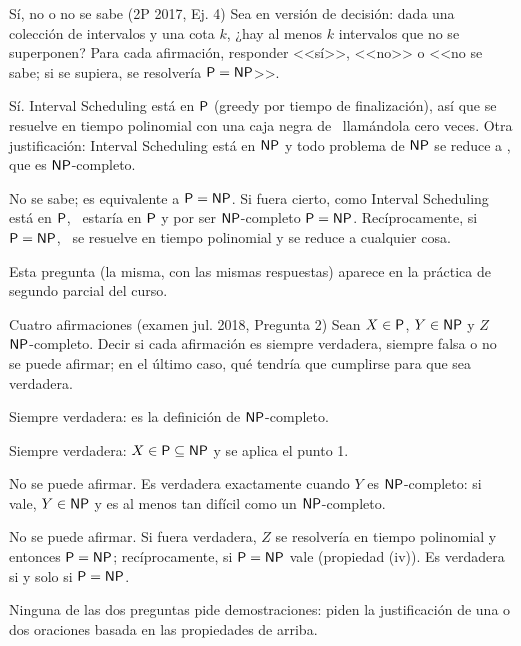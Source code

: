 \begin{problema}{Sí, no o no se sabe (2P 2017, Ej. 4)}
Sea  en versión de decisión: dada una colección de intervalos y una cota $k$, ¿hay al menos $k$ intervalos que no se superponen? Para cada afirmación, responder <<sí>>, <<no>> o <<no se sabe; si se supiera, se resolvería $\mathsf{P}=\mathsf{NP}$>>.

 Sí. Interval Scheduling está en $\mathsf{P}$ (greedy por tiempo de finalización), así que se resuelve en tiempo polinomial con una caja negra de \npVC\ llamándola cero veces. Otra justificación: Interval Scheduling está en $\mathsf{NP}$ y todo problema de $\mathsf{NP}$ se reduce a \npVC, que es $\mathsf{NP}$-completo.

 No se sabe; es equivalente a $\mathsf{P}=\mathsf{NP}$. Si fuera cierto, como Interval Scheduling está en $\mathsf{P}$, \npIS\ estaría en $\mathsf{P}$ y por ser $\mathsf{NP}$-completo $\mathsf{P}=\mathsf{NP}$. Recíprocamente, si $\mathsf{P}=\mathsf{NP}$, \npIS\ se resuelve en tiempo polinomial y se reduce a cualquier cosa.
\end{problema}

Esta pregunta (la misma, con las mismas respuestas) aparece en la práctica de segundo parcial del curso.

\begin{problema}{Cuatro afirmaciones (examen jul. 2018, Pregunta 2)}
Sean $X\in\mathsf{P}$, $Y\in\mathsf{NP}$ y $Z$ $\mathsf{NP}$-completo. Decir si cada afirmación es siempre verdadera, siempre falsa o no se puede afirmar; en el último caso, qué tendría que cumplirse para que sea verdadera.

 Siempre verdadera: es la definición de $\mathsf{NP}$-completo.

 Siempre verdadera: $X\in\mathsf{P}\subseteq\mathsf{NP}$ y se aplica el punto 1.

 No se puede afirmar. Es verdadera exactamente cuando $Y$ es $\mathsf{NP}$-completo: si vale, $Y\in\mathsf{NP}$ y es al menos tan difícil como un $\mathsf{NP}$-completo.

 No se puede afirmar. Si fuera verdadera, $Z$ se resolvería en tiempo polinomial y entonces $\mathsf{P}=\mathsf{NP}$; recíprocamente, si $\mathsf{P}=\mathsf{NP}$ vale (propiedad (iv)). Es verdadera si y solo si $\mathsf{P}=\mathsf{NP}$.
\end{problema}

Ninguna de las dos preguntas pide demostraciones: piden la justificación de una o dos oraciones basada en las propiedades de arriba.

